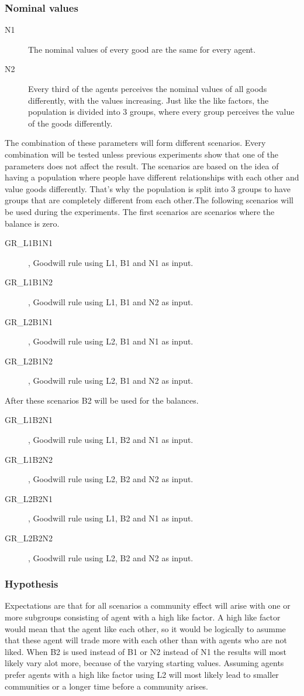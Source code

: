 \documentclass[twoside,openright]{uva-bachelor-thesis}
\begin{document}
\subsubsection{Nominal values}
\begin{description}
\item[N1]	The nominal values of every good are the same for every agent.
\item[N2]	Every third of the agents perceives the nominal values of all goods differently, with the values increasing. Just like the like factors, the population is divided into 3 groups, where every group perceives the value of the goods differently.
\end{description}
The combination of these parameters will form different scenarios. Every combination will be tested unless previous experiments show that one of the parameters does not affect the result. The scenarios are based on the idea of having a population where people have different relationships with each other and value goods differently. That’s why the population is split into 3 groups to have groups that are completely different from each other.The following scenarios will be used during the experiments.
The first scenarios are scenarios where the balance is zero.
\begin{description}
\item[GR\_L1B1N1], Goodwill rule using L1, B1 and N1 as input.
\item[GR\_L1B1N2], Goodwill rule using L1, B1 and N2 as input.
\item[GR\_L2B1N1], Goodwill rule using L2, B1 and N1 as input.
\item[GR\_L2B1N2], Goodwill rule using L2, B1 and N2 as input.
\end{description}
After these scenarios B2 will be used for the balances.
\begin{description}
\item[GR\_L1B2N1], Goodwill rule using L1, B2 and N1 as input.
\item[GR\_L1B2N2], Goodwill rule using L2, B2 and N2 as input.
\item[GR\_L2B2N1], Goodwill rule using L1, B2 and N1 as input.
\item[GR\_L2B2N2], Goodwill rule using L2, B2 and N2 as input.
\end{description}

\subsubsection{Hypothesis}
Expectations are that for all scenarios a community effect will arise with one or more subgroups consisting of agent with a high like factor. A high like factor would mean that the agent like each other, so it would be logically to asumme that these agent will trade more with each other than with agents who are not liked. When B2 is used instead of B1 or N2 instead of N1 the results will most likely vary alot more, because of the varying starting values. Assuming agents prefer agents with a high like factor using L2 will most likely lead to smaller communities or a longer time before a community arises.
\end{document}
